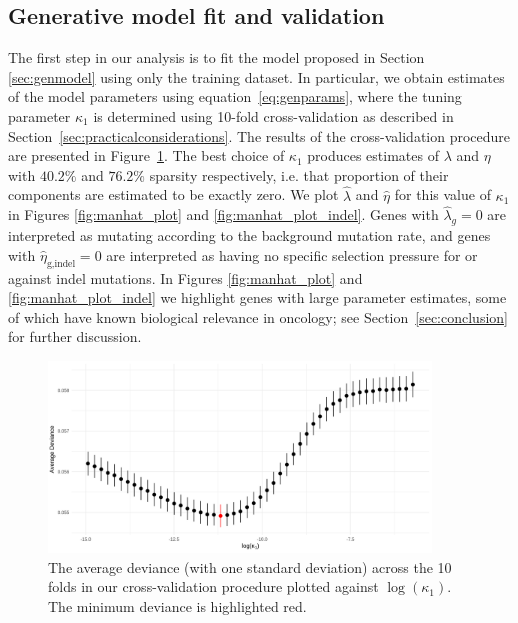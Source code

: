 \documentclass[12pt]{article}
\begin{document}

\subsection{Generative model fit and validation \label{sec:genmodelfit}}
The first step in our analysis is to fit the model proposed in Section \ref{sec:genmodel} using only the training dataset. In particular, we obtain estimates of the model parameters using equation~\eqref{eq:genparams}, where the tuning parameter $\kappa_1$ is determined using 10-fold cross-validation as described in Section~\ref{sec:practicalconsiderations}.  The results of the cross-validation procedure are presented in Figure~\ref{fig:genmodelstats}. The best choice of $\kappa_1$ produces estimates of $\lambda$ and $\eta$ with $40.2\%$ and $76.2\%$ sparsity respectively, i.e. that proportion of their components are estimated to be exactly zero. We plot $\hat{\lambda}$ and $\hat{\eta}$ for this value of $\kappa_1$ in Figures \ref{fig:manhat_plot} and \ref{fig:manhat_plot_indel}. Genes with $\hat{\lambda}_g = 0$ are interpreted as mutating according to the background mutation rate, and genes with $\hat{\eta}_{\text{g,indel}} = 0$ are interpreted as having no specific selection pressure for or against indel mutations. In Figures \ref{fig:manhat_plot} and \ref{fig:manhat_plot_indel} we highlight genes with large parameter estimates, some of which have known biological relevance in oncology; see Section~\ref{sec:conclusion} for further discussion.   
\begin{figure}[htbp]
\centering
\vspace*{-5mm}
\includegraphics[width=4in]{fig3.png}
\vspace*{0mm}
\caption{The average deviance (with one standard deviation) across the 10 folds in our cross-validation procedure plotted against $\log(\kappa_1)$. The minimum deviance is highlighted red.\label{fig:genmodelstats}}
\vspace*{-2mm}
\end{figure}
\end{document}

